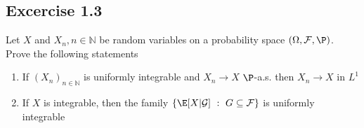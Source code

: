 \subsection*{Excercise 1.3}
\begin{exercise}
 Let $X$ and $X_n , n \in  \mathbb{N}$  be random variables on a probability space $(\Omega ,\mathcal{F},\P)$. Prove the following 
 statements 
 \begin{enumerate}
   \item If $(X_n)_{n \in  \mathbb{N}}$ is uniformly integrable and $X_n \to  X$ $\P$-a.s. then $X_n \to  X$ in $L^1$
   \item If $X$ is integrable, then the family $\{\E[X|\mathcal{G}] \ : \ G \subseteq \mathcal{F} \}  $ is uniformly integrable
 \end{enumerate}
\end{exercise}
